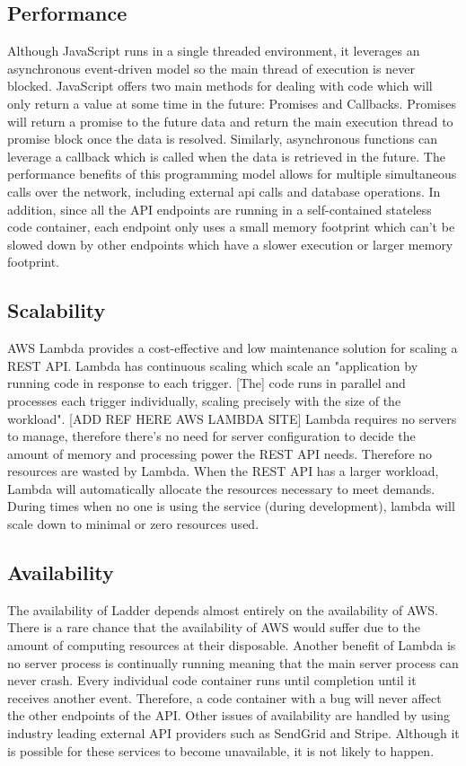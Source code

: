 \documentclass[conference]{IEEEtran}
\begin{document}
\subsection{Performance}
Although JavaScript runs in a single threaded environment, it leverages an asynchronous event-driven model so the main thread of execution is never blocked. JavaScript offers two main methods for dealing with code which will only return a value at some time in the future: Promises and Callbacks. Promises will return a promise to the future data and return the main execution thread to promise block once the data is resolved. Similarly, asynchronous functions can leverage a callback which is called when the data is retrieved in the future. The performance benefits of this programming model allows for multiple simultaneous calls over the network, including external api calls and database operations. In addition, since all the API endpoints are running in a self-contained stateless code container, each endpoint only uses a small memory footprint which can't be slowed down by other endpoints which have a slower execution or larger memory footprint.

\subsection{Scalability}
AWS Lambda provides a cost-effective and low maintenance solution for scaling a REST API. Lambda has continuous scaling which scale an "application by running code in response to each trigger. [The] code runs in parallel and processes each trigger individually, scaling precisely with the size of the workload". [ADD REF HERE AWS LAMBDA SITE] Lambda requires no servers to manage, therefore there's no need for server configuration to decide the amount of memory and processing power the REST API needs. Therefore no resources are wasted by Lambda. When the REST API has a larger workload, Lambda will automatically allocate the resources necessary to meet demands. During times when no one is using the service (during development), lambda will scale down to minimal or zero resources used.

\subsection{Availability}
The availability of Ladder depends almost entirely on the availability of AWS. There is a rare chance that the availability of AWS would suffer due to the amount of computing resources at their disposable. Another benefit of Lambda is no server process is continually running meaning that the main server process can never crash. Every individual code container runs until completion until it receives another event. Therefore, a code container with a bug will never affect the other endpoints of the API. Other issues of availability are handled by using industry leading external API providers such as SendGrid and Stripe. Although it is possible for these services to become unavailable, it is not likely to happen.
\end{document}
